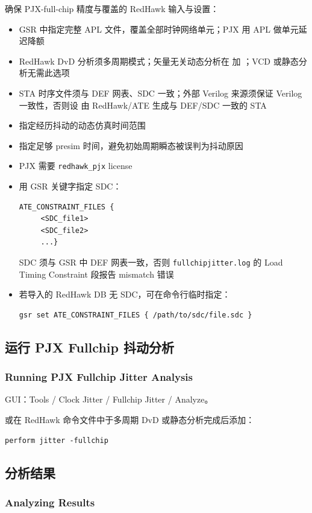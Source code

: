 确保 PJX-full-chip 精度与覆盖的 RedHawk 输入与设置：
\begin{itemize}
  \item GSR 中指定完整 APL 文件，覆盖全部时钟网络单元；PJX 用 APL 做单元延迟降额
  \item RedHawk DvD 分析须多周期模式；矢量无关动态分析在  加 ；VCD 或静态分析无需此选项
  \item STA 时序文件须与 DEF 网表、SDC 一致；外部 Verilog 来源须保证 Verilog 一致性，否则设  由 RedHawk/ATE 生成与 DEF/SDC 一致的 STA
  \item 指定经历抖动的动态仿真时间范围
  \item 指定足够 presim 时间，避免初始周期瞬态被误判为抖动原因
  \item PJX 需要 \texttt{redhawk\_pjx} license
  \item 用 GSR 关键字指定 SDC：
\begin{lstlisting}
ATE_CONSTRAINT_FILES {
     <SDC_file1>
     <SDC_file2>
     ...}
\end{lstlisting}
  SDC 须与 GSR 中 DEF 网表一致，否则 \texttt{fullchipjitter.log} 的 Load Timing Constraint 段报告 mismatch 错误
  \item 若导入的 RedHawk DB 无 SDC，可在命令行临时指定：
\begin{lstlisting}
gsr set ATE_CONSTRAINT_FILES { /path/to/sdc/file.sdc }
\end{lstlisting}
\end{itemize}

\subsection{运行 PJX Fullchip 抖动分析}
\subsubsection*{Running PJX Fullchip Jitter Analysis}

GUI：Tools / Clock Jitter / Fullchip Jitter / Analyze。

或在 RedHawk 命令文件中于多周期 DvD 或静态分析完成后添加：
\begin{lstlisting}
perform jitter -fullchip
\end{lstlisting}

\subsection{分析结果}
\subsubsection*{Analyzing Results}

